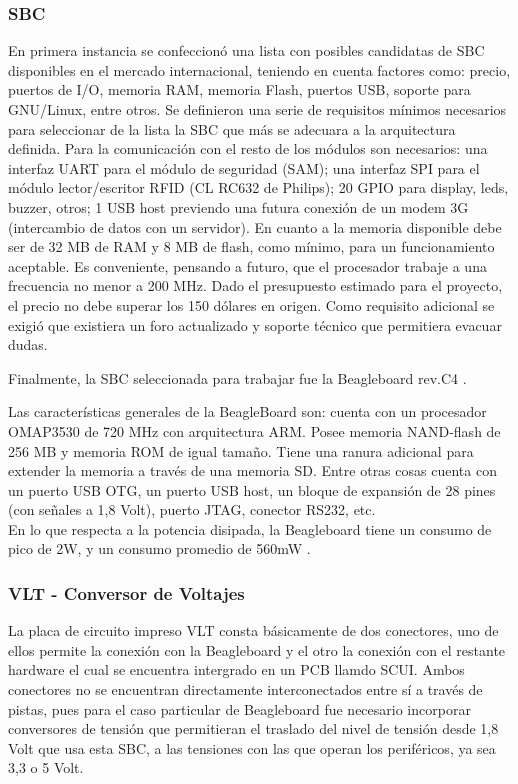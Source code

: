 \documentclass[%
        final,
        notitlepage,
        narroweqnarray,
        inline,
        ]{ieee}
\begin{document}
\subsubsection{SBC}
En primera instancia se confeccionó una lista con posibles candidatas de SBC disponibles
en el mercado internacional, teniendo en cuenta factores como: precio, puertos de I/O, memoria RAM, memoria Flash, puertos USB, soporte para GNU/Linux, entre otros.
Se definieron una serie de requisitos mínimos necesarios para seleccionar de la lista la SBC que más se adecuara a la arquitectura definida.
Para la comunicación con el resto de los módulos son necesarios: una interfaz UART para el módulo de seguridad (SAM); una interfaz SPI para el módulo lector/escritor RFID (CL RC632 de Philips); 20 GPIO para display, leds, buzzer, otros; 1 USB host previendo una futura conexión de un modem 3G (intercambio de datos con un servidor). En cuanto a la memoria disponible debe ser de 32 MB de RAM y 8 MB de flash,  como mínimo, para un funcionamiento aceptable. Es conveniente, pensando a futuro, que el procesador trabaje a una frecuencia no menor a 200 MHz.
Dado el presupuesto estimado para el proyecto, el precio no debe superar los 150 dólares en origen.
Como requisito adicional se exigió que existiera un foro actualizado y soporte técnico que permitiera evacuar dudas.

Finalmente, la SBC seleccionada para trabajar fue la Beagleboard rev.C4 \cite{Beagle}.

Las características generales de la BeagleBoard son: cuenta con un procesador OMAP3530 de 720 MHz con arquitectura ARM. Posee  memoria NAND-flash de 256 MB y memoria ROM de igual tamaño. Tiene una ranura adicional para extender la memoria a través de una memoria SD. Entre otras cosas cuenta con un puerto USB OTG, un puerto USB host, un bloque de expansión de 28 pines (con señales a 1,8 Volt), puerto JTAG, conector RS232, etc.\\
En lo que respecta a la potencia disipada, la Beagleboard tiene un consumo de pico de 2W, y un consumo promedio de 560mW \cite{consumo1} \cite{consumo2}.

\subsubsection{VLT - Conversor de Voltajes}
La placa de circuito impreso VLT consta básicamente de dos conectores, uno de ellos permite la conexión con la Beagleboard y el otro la conexión con el restante hardware el cual se encuentra intergrado en un PCB llamdo SCUI. Ambos conectores no se encuentran directamente interconectados entre sí a través de pistas, pues para el caso particular de Beagleboard fue necesario incorporar conversores de tensión que permitieran el traslado del nivel de tensión desde 1,8 Volt que usa esta SBC, a las tensiones con las que operan los periféricos, ya sea 3,3 o 5 Volt.
\end{document}
